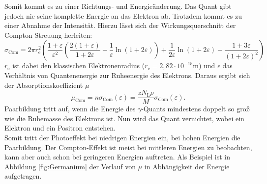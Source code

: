 Somit kommt es zu einer Richtungs- und Energieänderung. Das Quant gibt jedoch nie seine komplette Energie an das Elektron ab. Trotzdem kommt es zu einer Abnahme der Intensität. Hierzu lässt sich der Wirkungsquerschnitt der Compton Streuung herleiten:
\begin{equation}
	\sigma_\text{Com} = 2 \pi r_\text{e}^2\left(\frac{1+\varepsilon}{\varepsilon^2}\left(\frac{2(1+\varepsilon)}{1 + 2\varepsilon} -
	\frac{1}{\varepsilon}\ln(1+2\varepsilon)\right) + \frac{1}{2\varepsilon}\ln(1+2\varepsilon) - \frac{1+3\varepsilon}{(1+2\varepsilon)^2}\right)
\end{equation}
$r_\text{e}$ ist dabei den klassischen Elektronenradius ($r_\text{e} = 2,82\cdot10^{-15} \text{m}$) und $\epsilon$ das Verhältnis von Quantenenergie zur Ruheenergie des Elektrons.
Daraus ergibt sich der Absorptionskoeffizient $\mu$
\begin{equation}
	\mu_\text{Com} = n \sigma_\text{Com}(\varepsilon) = \frac{z N_\text{L} \rho}{M} \sigma_\text{Com}(\varepsilon) .
\end{equation}
Paarbildung tritt auf, wenn die Energie des $\gamma$-Quants mindestens doppelt so groß wie die Ruhemasse des Elektrons ist. 
Nun wird das Quant vernichtet, wobei ein Elektron und ein Positron entstehen. \\
Somit tritt der Photoeffekt bei niedrigen Energien ein, bei hohen Energien die Paarbildung. Der Compton-Effekt ist meist bei mittleren Energien zu beobachten, kann aber auch schon bei geringeren Energien auftreten. Als Beispiel ist in Abbildung \ref{fig:Germanium} der Verlauf von $\mu$ in Abhängigkeit der Energie aufgetragen.
